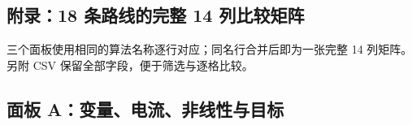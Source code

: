 \documentclass[10pt,a4paper]{article}
\newcommand{\ReportTableSize}{\footnotesize}
\begin{document}
\clearpage
\begin{landscape}
\renewcommand{\ReportTableSize}{\small}

\hypertarget{ux9644ux5f5518-ux6761ux8defux7ebfux7684ux5b8cux6574-14-ux5217ux6bd4ux8f83ux77e9ux9635}{%
\section{附录：18 条路线的完整 14
列比较矩阵}\label{ux9644ux5f5518-ux6761ux8defux7ebfux7684ux5b8cux6574-14-ux5217ux6bd4ux8f83ux77e9ux9635}}

三个面板使用相同的算法名称逐行对应；同名行合并后即为一张完整 14
列矩阵。另附 CSV 保留全部字段，便于筛选与逐格比较。

\hypertarget{ux9762ux677f-aux53d8ux91cfux7535ux6d41ux975eux7ebfux6027ux4e0eux76eeux6807}{%
\subsection{面板
A：变量、电流、非线性与目标}\label{ux9762ux677f-aux53d8ux91cfux7535ux6d41ux975eux7ebfux6027ux4e0eux76eeux6807}}


\end{landscape}
\end{document}
